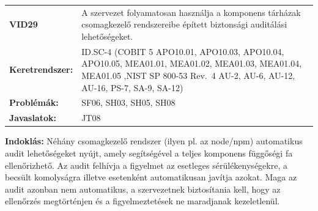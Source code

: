 \documentclass[12pt,magyar,a4paper,oneside]{scrreprt}
\begin{document}
\begin{longtable}[]{@{}ll@{}}
\toprule
\endhead
\begin{minipage}[t]{0.16\columnwidth}\raggedright
\textbf{VID29}\strut
\end{minipage} & \begin{minipage}[t]{0.79\columnwidth}\raggedright
A szervezet folyamatosan használja a komponens tárházak csomagkezelő
rendszereibe épített biztonsági auditálási lehetőségeket.\strut
\end{minipage}\tabularnewline
\begin{minipage}[t]{0.16\columnwidth}\raggedright
\textbf{Keretrendszer:}\strut
\end{minipage} & \begin{minipage}[t]{0.79\columnwidth}\raggedright
ID.SC-4 (COBIT 5 APO10.01, APO10.03, APO10.04, APO10.05, MEA01.01,
MEA01.02, MEA01.03, MEA01.04, MEA01.05 ,NIST SP 800-53 Rev.~4 AU-2,
AU-6, AU-12, AU-16, PS-7, SA-9, SA-12)\strut
\end{minipage}\tabularnewline
\begin{minipage}[t]{0.16\columnwidth}\raggedright
\textbf{Problémák:}\strut
\end{minipage} & \begin{minipage}[t]{0.79\columnwidth}\raggedright
SF06, SH03, SH05, SH08\strut
\end{minipage}\tabularnewline
\begin{minipage}[t]{0.16\columnwidth}\raggedright
\textbf{Javaslatok:}\strut
\end{minipage} & \begin{minipage}[t]{0.79\columnwidth}\raggedright
JT08\strut
\end{minipage}\tabularnewline
\bottomrule
\end{longtable}

\textbf{Indoklás: } Néhány csomagkezelő rendszer (ilyen pl. az node/npm)
automatikus audit lehetőségeket nyújt, amely segítségével a teljes
komponens függőségi fa ellenőrizhető. Az audit felhívja a figyelmet az
esetleges sérülékenységekre, a becsült komolyságra illetve esetenként
automatikusan javítja azokat. Maga az audit azonban nem automatikus, a
szervezetnek biztosítania kell, hogy az ellenőrzés megtörténjen és a
figyelmeztetések ne maradjanak kezeletlenül.
\end{document}
